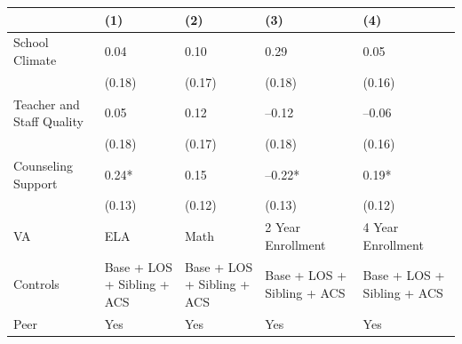 \documentclass{article}
\begin{document}
\begin{table}[tbp] \centering
{}

{\footnotesize
\begin{tabularx}{\linewidth}{lCCCC}

\toprule
&{(1)}&{(2)}&{(3)}&{(4)} \tabularnewline
\midrule \addlinespace[\belowrulesep]
School Climate&0.04&0.10&0.29&0.05 \tabularnewline
&(0.18)&(0.17)&(0.18)&(0.16) \tabularnewline
Teacher and Staff Quality&0.05&0.12&--0.12&--0.06 \tabularnewline
&(0.18)&(0.17)&(0.18)&(0.16) \tabularnewline
Counseling Support&0.24*&0.15&--0.22*&0.19* \tabularnewline
&(0.13)&(0.12)&(0.13)&(0.12) \tabularnewline
\midrule VA&ELA&Math&2 Year Enrollment&4 Year Enrollment \tabularnewline
Controls&Base + LOS + Sibling + ACS&Base + LOS + Sibling + ACS&Base + LOS + Sibling + ACS&Base + LOS + Sibling + ACS \tabularnewline
Peer&Yes&Yes&Yes&Yes \tabularnewline
\bottomrule 

\end{tabularx}
}
\end{table}
\end{document}
